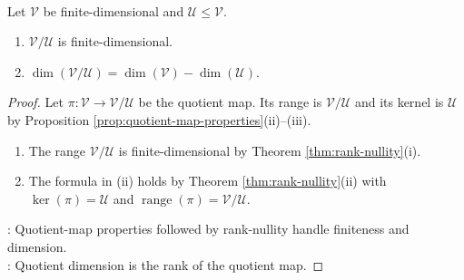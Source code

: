 \begin{theorem} \label{thm:dimension-of-quotient} \\
Let $\mathcal{V}$ be finite-dimensional and $\mathcal{U}\leq\mathcal{V}$.
\begin{enumerate}[label=(\roman*)]
\setlength{\itemsep}{0pt}
\item $\mathcal{V}/\mathcal{U}$ is finite-dimensional.
\item $\dim(\mathcal{V}/\mathcal{U})=\dim(\mathcal{V})-\dim(\mathcal{U})$.
\end{enumerate}
\begin{proof}
Let $\pi:\mathcal{V}\to\mathcal{V}/\mathcal{U}$ be the quotient map. Its range is $\mathcal{V}/\mathcal{U}$ and its kernel is $\mathcal{U}$ by Proposition \ref{prop:quotient-map-properties}(ii)--(iii).
\begin{enumerate}[label=(\roman*)]
\setlength{\itemsep}{0pt}
\item The range $\mathcal{V}/\mathcal{U}$ is finite-dimensional by Theorem \ref{thm:rank-nullity}(i).
\item The formula in (ii) holds by Theorem \ref{thm:rank-nullity}(ii) with $\ker(\pi)=\mathcal{U}$ and $\operatorname{range}(\pi)=\mathcal{V}/\mathcal{U}$.
\end{enumerate}
: Quotient-map properties followed by rank-nullity handle finiteness and dimension.\\
: Quotient dimension is the rank of the quotient map.
\end{proof}
\end{theorem}

